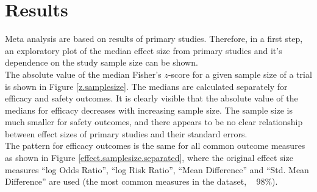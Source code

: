 \documentclass[11pt,a4paper,twoside]{book}\usepackage[]{graphicx}\usepackage[]{color}
\begin{document}






































\chapter{Results} \label{ch:Results}




Meta analysis are based on results of primary studies. Therefore, in a first step, an exploratory plot of the median effect size from primary studies and it's dependence on the study sample size can be shown. \\
The absolute value of the median Fisher's $z$-score for a given sample size of a trial is shown in Figure \ref{z.samplesize}. The medians are calculated separately for efficacy and safety outcomes. It is clearly visible that the absolute value of the medians for efficacy decreases with increasing sample size. The sample size is much smaller for safety outcomes, and there appears to be no clear relationship between effect sizes of primary studies and their standard errors.\\
The pattern for efficacy outcomes is the same for all common outcome measures as shown in Figure \ref{effect.samplesize.separated}, where the original effect size measures ``log Odds Ratio'', ``log Risk Ratio'', ``Mean Difference'' and ``Std. Mean Difference'' are used (the most common measures in the dataset, ~ 98\%). 
\end{document}
